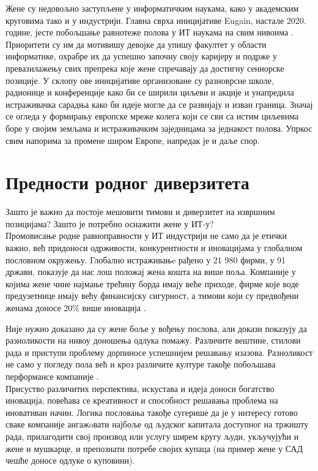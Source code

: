 \documentclass[a4paper]{article}
\begin{document}
Жене су недовољно заступљене у информатичким наукама, како у академским 
круговима тако и у индустрији. Главна сврха иницијативе Eugain, настале 2020. 
године, јесте побољшање равнотеже полова у ИТ наукама на свим нивоима \cite{eugain}. Приоритети 
су им да мотивишу девојке да упишу факултет у области информатике, охрабре их 
да успешно започну своју каријеру и подрже у превазилажењу свих препрека које жене 
спречавају да достигну сениорске позиције. У склопу ове иницијативе организоване 
су разноврсне школе, радионице и конференције како би се ширили циљеви и акције и 
унапредила истраживачка сарадња како би идеје могле да се развијају и изван граница. 
Значај се огледа у формирању европске мреже колега који се сви са истим циљевима 
боре у својим земљама и истраживачким заједницама за једнакост полова. Упркос 
свим напорима за промене широм Европе, напредак је и даље спор.

\section{Предности родног диверзитета} 
\label{sec:prednosti}
Зашто је важно да постоје мешовити тимови и диверзитет на извршним позицијама? 
Зашто је потребно оснажити жене у ИТ-у? \\
Промовисање родне равноправности у ИТ индустрији не само да је етички важно, већ придоноси 
одрживости, конкурентности и иновацијама у глобалном пословном окружењу. Глобално истраживањe 
рађено у 21 980 фирми, у 91 држави, показује да нас лош положај жена кошта на више поља.
Компаније у којима жене чине најмање трећину борда имају веће приходе, фирме
које воде предузетнице имају већу финансијску сигурност, а тимови који су предвођени
женама доносе 20\% више иновација \cite{prednosti}. 

Није нужно доказано да су жене боље у вођењу послова, али докази показују да разноликости 
на нивоу доношења одлука помажу. Различите вештине, стилови рада и приступи проблему 
дорпиносе успешнијем решавању изазова. Разноликост не само у погледу пола већ и 
кроз различите културе такође побољшава перформансе компаније \cite{kultura}.\\ 

\newpage
Присуство различитих перспектива, искустава и идеја доноси богатство иновација, 
повећава се креативност и способност решавања проблема на иновативан начин. 
Логика пословања такође сугерише да је у интересу готово сваке компаније 
ангажoвати најбоље од људског капитала доступног на тржишту рада, прилагодити свој
производ или услугу ширем кругу људи, укључујући и жене и мушкарце, и препознати
потребе својих купаца (на пример жене у САД чешће доносе одлуке о куповини).
\end{document}
